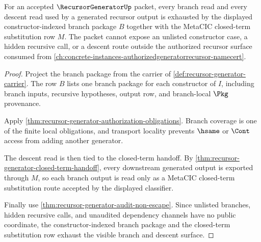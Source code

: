 \begin{theorem}
\label{thm:recursor-generator-branch-descent-exhaustion}
For an accepted $\RecursorGeneratorUp$ packet, every branch read and every descent read used by a generated recursor output is exhausted by the displayed constructor-indexed branch package $B$ together with the MetaCIC closed-term substitution row $M$. The packet cannot expose an unlisted constructor case, a hidden recursive call, or a descent route outside the authorized recursor surface consumed from \autoref{ch:concrete-instances-authorizedgeneratorrecursor-namecert}.
\end{theorem}
\begin{proof}
Project the branch package from the carrier of \autoref{def:recursor-generator-carrier}. The row $B$ lists one branch package for each constructor of $I$, including branch inputs, recursive hypotheses, output row, and branch-local $\Pkg$ provenance.

Apply \autoref{thm:recursor-generator-authorization-obligations}. Branch coverage is one of the finite local obligations, and transport locality prevents $\hsame$ or $\Cont$ access from adding another generator.

The descent read is then tied to the closed-term handoff. By \autoref{thm:recursor-generator-closed-term-handoff}, every downstream generated output is exported through $M$, so each branch output is read only as a MetaCIC closed-term substitution route accepted by the displayed classifier.

Finally use \autoref{thm:recursor-generator-audit-non-escape}. Since unlisted branches, hidden recursive calls, and unaudited dependency channels have no public coordinate, the constructor-indexed branch package and the closed-term substitution row exhaust the visible branch and descent surface.
\end{proof}

